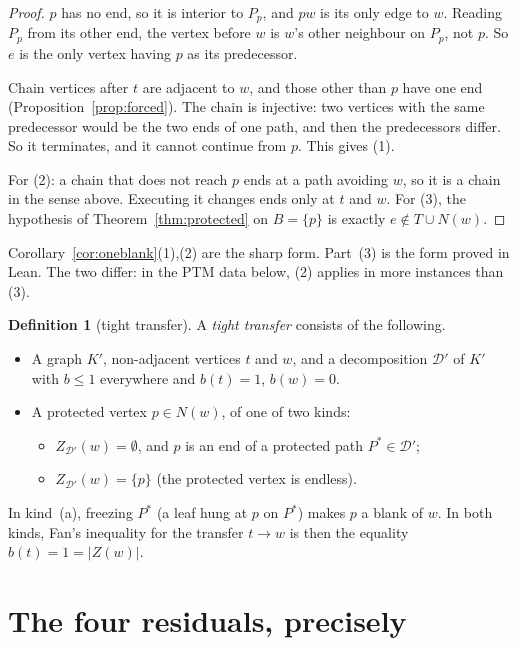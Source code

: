 \documentclass[11pt]{amsart}
\theoremstyle{definition}
\newtheorem{definition}[theorem]{Definition}
\newcommand{\cD}{\mathcal D}
\begin{document}
\begin{proof}
$p$ has no end, so it is interior to $P_p$, and $pw$ is its only edge to $w$. Reading $P_p$ from its
other end, the vertex before $w$ is $w$'s other neighbour on $P_p$, not $p$. So $e$ is the only
vertex having $p$ as its predecessor.

Chain vertices after $t$ are adjacent to $w$, and those other than $p$ have one end
(Proposition~\ref{prop:forced}). The chain is injective: two vertices with the same predecessor would
be the two ends of one path, and then the predecessors differ. So it terminates, and it cannot
continue from $p$. This gives (1).

For (2): a chain that does not reach $p$ ends at a path avoiding $w$, so it is a chain in the sense
above. Executing it changes ends only at $t$ and $w$. For (3), the hypothesis of
Theorem~\ref{thm:protected} on $B=\{p\}$ is exactly $e\notin T\cup N(w)$.
\end{proof}

Corollary~\ref{cor:oneblank}(1),(2) are the sharp form. Part~(3) is the form proved in Lean.
The two differ: in the PTM data below, (2) applies in more instances than (3).

\begin{definition}[tight transfer]\label{def:tight}
A \emph{tight transfer} consists of the following.
\begin{itemize}
\item A graph $K'$, non-adjacent vertices $t$ and $w$, and a decomposition $\cD'$ of $K'$ with
$b\le1$ everywhere and $b(t)=1$, $b(w)=0$.
\item A protected vertex $p\in N(w)$, of one of two kinds:
  \begin{itemize}
  \item[(a)] $Z_{\cD'}(w)=\emptyset$, and $p$ is an end of a protected path $P^*\in\cD'$;
  \item[(b)] $Z_{\cD'}(w)=\{p\}$ (the protected vertex is endless).
  \end{itemize}
\end{itemize}
In kind~(a), freezing $P^*$ (a leaf hung at $p$ on $P^*$) makes $p$ a blank of $w$. In both kinds,
Fan's inequality for the transfer $t\to w$ is then the equality $b(t)=1=|Z(w)|$.
\end{definition}

\section{The four residuals, precisely}\label{sec:four}
\end{document}
